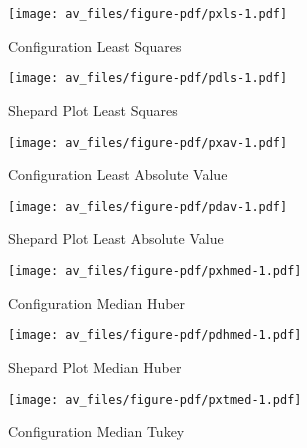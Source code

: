 \documentclass[
  12pt,
  letterpaper,
  DIV=11,
  numbers=noendperiod]{scrartcl}
\begin{document}
\begin{figure}[H]

{\centering \texttt{[image: av\_files/figure-pdf/pxls-1.pdf]}

}

\caption{Configuration Least Squares}

\end{figure}%

\begin{figure}[H]

{\centering \texttt{[image: av\_files/figure-pdf/pdls-1.pdf]}

}

\caption{Shepard Plot Least Squares}

\end{figure}%

\begin{figure}[H]

{\centering \texttt{[image: av\_files/figure-pdf/pxav-1.pdf]}

}

\caption{Configuration Least Absolute Value}

\end{figure}%

\begin{figure}[H]

{\centering \texttt{[image: av\_files/figure-pdf/pdav-1.pdf]}

}

\caption{Shepard Plot Least Absolute Value}

\end{figure}%

\begin{figure}[H]

{\centering \texttt{[image: av\_files/figure-pdf/pxhmed-1.pdf]}

}

\caption{Configuration Median Huber}

\end{figure}%

\begin{figure}[H]

{\centering \texttt{[image: av\_files/figure-pdf/pdhmed-1.pdf]}

}

\caption{Shepard Plot Median Huber}

\end{figure}%

\begin{figure}[H]

{\centering \texttt{[image: av\_files/figure-pdf/pxtmed-1.pdf]}

}

\caption{Configuration Median Tukey}

\end{figure}%
\end{document}
